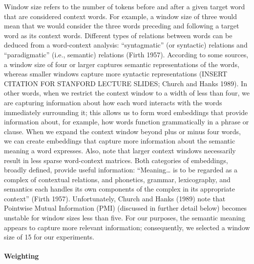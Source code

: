 \documentclass{article}
\begin{document}
Window size refers to the number of tokens before and after a given
target word that are considered context words. For example, a window
size of three would mean that we would consider the three words
preceding and following a target word as its context words. Different
types of relations between words can be deduced from a word-context
analysis: ``syntagmatic'' (or syntactic) relations and ``paradigmatic''
(i.e., semantic) relations (Firth 1957). According to some sources, a
window size of four or larger captures semantic representations of the
words, whereas smaller windows capture more syntactic representations
(INSERT CITATION FOR STANFORD LECTURE SLIDES; Church and Hanks 1989). In
other words, when we restrict the context window to a width of less than
four, we are capturing information about how each word interacts with
the words immediately surrounding it; this allows us to form word
embeddings that provide information about, for example, how words
function grammatically in a phrase or clause. When we expand the context
window beyond plus or minus four words, we can create embeddings that
capture more information about the semantic meaning a word expresses.
Also, note that larger context windows necessarily result in less sparse
word-context matrices. Both categories of embeddings, broadly defined,
provide useful information: ``Meaning\ldots{} is to be regarded as a
complex of contextual relations, and phonetics, grammar, lexicography,
and semantics each handles its own components of the complex in its
appropriate context'' (Firth 1957). Unfortunately, Church and Hanks
(1989) note that Pointwise Mutual Information (PMI) (discussed in
further detail below) becomes unstable for window sizes less than five.
For our purposes, the semantic meaning appears to capture more relevant
information; consequently, we selected a window size of 15 for our
experiments.

\hypertarget{weighting}{%
\paragraph{Weighting}\label{weighting}}
\end{document}
